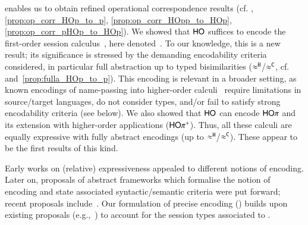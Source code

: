 \documentclass[preprint,11pt]{elsarticle}
\begin{document}
{{%
enables us to obtain 
 refined 
operational correspondence results (cf. , \ref{prop:op_corr_HOp_to_p}, \ref{prop:op_corr_HOpp_to_HOp}, \ref{prop:op_corr_pHOp_to_HOp}).
We showed that
$\mathsf{HO}$ suffices to encode   the first-order session
calculus~\cite{honda.vasconcelos.kubo:language-primitives}, here denoted~\sessp. %
To our knowledge, this is a new result; %
its significance is stressed by the demanding encodability criteria  considered, in particular full abstraction up to typed bisimilarities
($\approx^\mathtt{H}$/$\approx^\mathtt{C}$, cf.  and~\ref{prop:fulla_HOp_to_p}).
This encoding is relevant in a broader setting, as known encodings 
of name-passing into higher-order calculi~\cite{SaWabook,BundgaardHG06,DBLP:journals/entcs/MeredithR05,XuActa2012,DBLP:journals/corr/XuYL15}  require limitations
in source/target languages,
do not consider types,
 and/or fail to satisfy strong encodability criteria (see below). 
We also showed that $\mathsf{HO}$ can encode $\mathsf{HO}\pi$ and its extension with
higher-order applications ($\mathsf{HO\pi^{+}}$). 
Thus, %
all these  calculi are equally expressive with fully
abstract encodings (up to $\approx^\mathtt{H}$/$\approx^\mathtt{C}$).  
These appear to be the first results of this kind.

Early works on (relative) expressiveness appealed to different notions of encoding.
Later on, 
proposals of abstract 
frameworks which formalise the notion of encoding 
and state associated syntactic/semantic criteria 
were put forward; 
recent proposals include~\cite{DBLP:journals/iandc/Gorla10,DBLP:journals/tcs/FuL10,DBLP:journals/corr/abs-1208-2750,DBLP:conf/esop/PetersNG13,DBLP:journals/corr/PetersG15}. 
Our formulation of precise encoding () 
builds upon existing proposals (e.g.,~\cite{Palamidessi03,DBLP:journals/iandc/Gorla10,DBLP:conf/icalp/LanesePSS10})
 to account for the session types
associated to \HOp. %


}}
\end{document}
